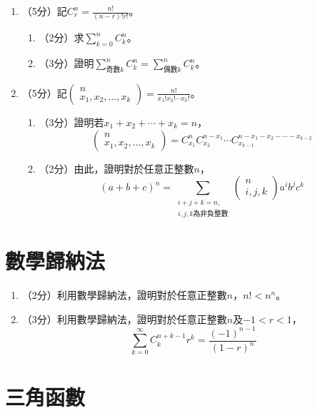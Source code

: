 \documentclass[12pt]{article}
\begin{document}
    \begin{enumerate}
        \item （5分）記$C_r^n=\frac{n!}{(n-r)!r!}$。\begin{enumerate}
            \item （2分）求$\sum_{k=0}^n C_k^n$。
            \item （3分）證明$\sum_{\textrm{奇數}k}^n C_k^n=\sum_{\textrm{偶數}k}^n C_k^n$。
        \end{enumerate}
        \item （5分）記$\begin{pmatrix}
            n\\x_1,x_2,\dots,x_k
        \end{pmatrix}=\frac{n!}{x_1!x_2!\cdots x_k!}$。\begin{enumerate}
            \item （3分）證明若$x_1+x_2+\cdots+x_k=n$，$$\begin{pmatrix}
                n\\x_1,x_2,\dots,x_k
            \end{pmatrix}=C_{x_1}^n C_{x_2}^{n-x_1}\cdots C_{x_{k-1}}^{n-x_1-x_2-\cdots-x_{k-2}}$$
            \item （2分）由此，證明對於任意正整數$n$，$$(a+b+c)^n=\sum_{\substack{i+j+k=n, \\ i,j,k\textrm{為非負整數}}} \begin{pmatrix}
                n\\i,j,k
            \end{pmatrix}a^ib^jc^k$$
        \end{enumerate}
    \end{enumerate}

    \section*{數學歸納法}

    \begin{enumerate}
        \item （2分）利用數學歸納法，證明對於任意正整數$n$，$n!<n^n$。
        \item （3分）利用數學歸納法，證明對於任意正整數$n$及$-1<r<1$，$$\sum_{k=0}^\infty C_k^{n+k-1}r^k=\frac{(-1)^{n-1}}{(1-r)^n}$$
    \end{enumerate}

    \section*{三角函數}
\end{document}
